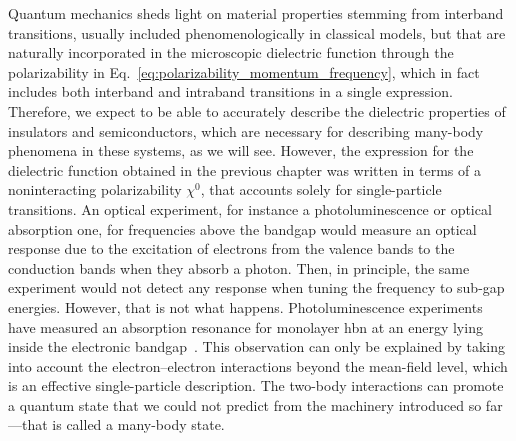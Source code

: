 Quantum mechanics sheds light on material properties stemming from interband transitions, usually included phenomenologically in classical models, but that are naturally incorporated in the microscopic dielectric function through the polarizability in Eq.~\eqref{eq:polarizability_momentum_frequency}, which in fact includes both interband and intraband transitions in a single expression.
Therefore, we expect to be able to accurately describe the dielectric properties of insulators and semiconductors, which are necessary for describing many-body phenomena in these systems, as we will see.
However, the expression for the dielectric function obtained in the previous chapter was written in terms of a noninteracting polarizability $\chi^0$, that accounts solely for single-particle transitions.
An optical experiment, for instance a photoluminescence or optical absorption one, for frequencies above the bandgap would measure an optical response due to the excitation of electrons from the valence bands to the conduction bands when they absorb a photon.
Then, in principle, the same experiment would not detect any response when tuning the frequency to sub-gap energies.
However, that is not what happens.
Photoluminescence experiments have measured an absorption resonance for monolayer \gls{hbn} at an energy lying inside the electronic bandgap~\cite{Cassabois_2019}.
This observation can only be explained by taking into account the electron--electron interactions beyond the mean-field level, which is an effective single-particle description.
The two-body interactions can promote a quantum state that we could not predict from the machinery introduced so far---that is called a many-body state.

